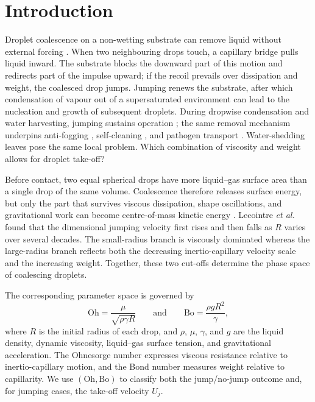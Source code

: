 \documentclass[
reprint,
amsmath,amssymb,
superscriptaddress,
onecolumn,
aps,
prfluids,
longbibliography,
floatfix
]{revtex4-2}
\newcommand{\Oh}{\mathrm{Oh}}
\newcommand{\Bo}{\mathrm{Bo}}
\begin{document}
\maketitle

\section{Introduction}\label{sec:introduction}

Droplet coalescence on a non-wetting substrate can remove liquid without external forcing \cite{boreyko2009self}. When two neighbouring drops touch, a capillary bridge pulls liquid inward. The substrate blocks the downward part of this motion and redirects part of the impulse upward; if the recoil prevails over dissipation and weight, the coalesced drop jumps.
Jumping renews the substrate, after which condensation of vapour out of a supersaturated environment can lead to the nucleation and growth of subsequent droplets. During dropwise condensation and water harvesting, jumping sustains operation \cite{miljkovic2013jumping,wen2017hierarchical,xie2019dropwise}; the same removal mechanism underpins anti-fogging \cite{mouterde2017antifogging}, self-cleaning \cite{wisdom2013selfcleaning}, and pathogen transport \cite{nath2019sneezing}.
Water-shedding leaves pose the same local problem. Which combination of viscosity and weight allows for droplet take-off?

Before contact, two equal spherical drops have more liquid--gas surface area than a single drop of the same volume. Coalescence therefore releases surface energy, but only the part that survives viscous dissipation, shape oscillations, and gravitational work can become centre-of-mass kinetic energy \cite{boreyko2009self,liu2014numerical,mouterde2017merging,lecointre2019ballistics,wasserfall2017coalescence}. Lecointre \textit{et al.} \cite{lecointre2019ballistics} found that the dimensional jumping velocity first rises and then falls as $R$ varies over several decades. The small-radius branch is viscously dominated whereas the large-radius branch reflects both the decreasing inertio-capillary velocity scale and the increasing weight. Together, these two cut-offs determine the phase space of coalescing droplets.

The corresponding parameter space is governed by
\begin{equation}
    \Oh = \frac{\mu}{\sqrt{\rho\gamma R}} \qquad \text{and} \qquad
    \Bo = \frac{\rho gR^2}{\gamma},
    \label{eq:controls_intro}
\end{equation}
where $R$ is the initial radius of each drop, and $\rho$, $\mu$, $\gamma$, and $g$ are the liquid density, dynamic viscosity, liquid--gas surface tension, and gravitational acceleration. The Ohnesorge number expresses viscous resistance relative to inertio-capillary motion, and the Bond number measures weight relative to capillarity. We use $(\Oh,\Bo)$ to classify both the jump/no-jump outcome and, for jumping cases, the take-off velocity $U_j$.
\end{document}
